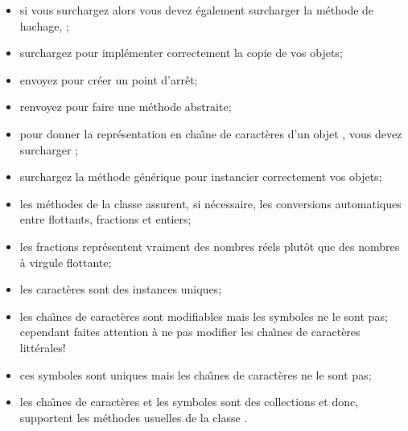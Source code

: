 \documentclass[a4paper,10pt,twoside]{book}
\begin{document}
\begin{itemize}

  \item si vous surchargez \ct{=} alors vous devez \'egalement
    surcharger la m\'ethode de hachage, ;

  \item surchargez  pour impl\'ementer correctement la copie de vos objets;

  \item envoyez  pour cr\'eer un point d'arr\^et;

  \item renvoyez  pour faire une m\'ethode abstraite;

  \item pour donner la repr\'esentation en cha\^{\i}ne de caract\`eres d'un objet , vous devez surcharger ;

  \item surchargez la m\'ethode g\'en\'erique  pour instancier correctement vos objets;


  \item les m\'ethodes de la classe  assurent, si
    n\'ecessaire, les conversions automatiques entre flottants, fractions et entiers;

  \item les fractions repr\'esentent vraiment des nombres r\'eels plut\^ot que des nombres \`a virgule flottante;

  \item les caract\`eres sont des instances uniques;

  \item les cha\^{\i}nes de caract\`eres sont modifiables mais les symboles ne le sont pas;
  cependant faites attention \`a ne pas modifier les cha\^{\i}nes de caract\`eres litt\'erales!

  \item ces symboles sont uniques mais les cha\^{\i}nes de caract\`eres ne le sont pas;

  \item les cha\^{\i}nes de caract\`eres et les symboles sont des collections et donc, supportent les m\'ethodes usuelles de la classe .

\end{itemize}

\ifx\wholebook\relax\else
   
   
\end{document}
